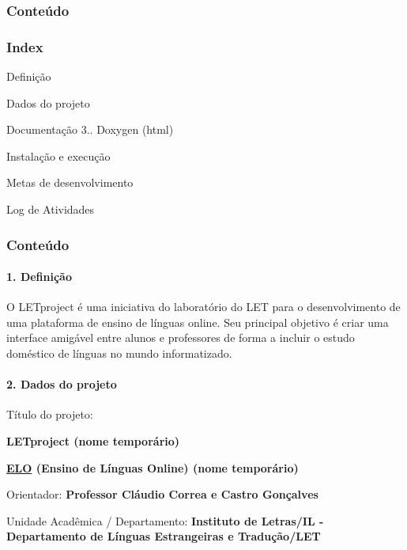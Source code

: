\subsubsection*{Conteúdo}

\subsubsection*{Index}


\begin{DoxyEnumerate}
\item Definição
\item Dados do projeto
\item Documentação 3.. Doxygen (html)
\item Instalação e execução
\item Metas de desenvolvimento
\item Log de Atividades
\end{DoxyEnumerate}

\subsubsection*{Conteúdo}

\paragraph*{1. Definição}

O L\-E\-Tproject é uma iniciativa do laboratório do L\-E\-T para o desenvolvimento de uma plataforma de ensino de línguas online. Seu principal objetivo é criar uma interface amigável entre alunos e professores de forma a incluir o estudo doméstico de línguas no mundo informatizado.

\paragraph*{2. Dados do projeto}

Título do projeto\-:
\begin{DoxyItemize}
\item {\bfseries L\-E\-Tproject (nome temporário)}
\item {\bfseries \hyperlink{namespaceELO}{E\-L\-O} (Ensino de Línguas Online) (nome temporário)}
\end{DoxyItemize}

Orientador\-: {\bfseries Professor Cláudio Correa e Castro Gonçalves}

Unidade Acadêmica / Departamento\-: {\bfseries Instituto de Letras/\-I\-L -\/ Departamento de Línguas Estrangeiras e Tradução/\-L\-E\-T}

